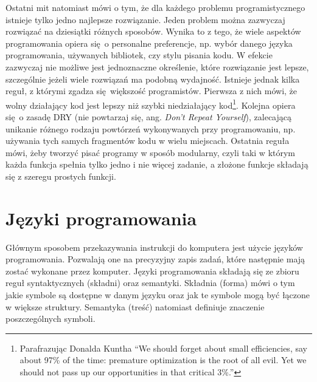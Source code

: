 \documentclass[paper=6in:9in,pagesize=pdftex,headinclude=on,footinclude=on,10pt]{scrbook}
\begin{document}
Ostatni mit natomiast mówi o tym, że dla każdego problemu programistycznego istnieje tylko jedno najlepsze rozwiązanie.
Jeden problem można zazwyczaj rozwiązać na dziesiątki różnych sposobów.
Wynika to z tego, że wiele aspektów programowania opiera się~o personalne preferencje, np. wybór danego języka programowania, używanych bibliotek, czy stylu pisania kodu.
W efekcie zazwyczaj nie możliwe jest jednoznaczne określenie, które rozwiązanie jest lepsze, szczególnie jeżeli wiele rozwiązań ma podobną wydajność.
Istnieje jednak kilka reguł, z którymi zgadza się~większość programistów.
Pierwsza z nich mówi, że wolny działający kod jest lepszy niż szybki niedziałający kod\footnote{Parafrazując Donalda Kuntha ``We should forget about small efficiencies, say about 97\% of the time: premature optimization is the root of all evil. Yet we should not pass up our opportunities in that critical 3\%.''}.
Kolejna opiera się~o zasadę DRY (nie powtarzaj się, ang. \emph{Don't Repeat Yourself}), zalecającą unikanie różnego rodzaju powtórzeń wykonywanych przy programowaniu, np. używania tych samych fragmentów kodu w wielu miejscach.
Ostatnia reguła mówi, żeby tworzyć pisać programy w sposób modularny, czyli taki w którym każda funkcja spełnia tylko jedno i nie więcej zadanie, a złożone funkcje składają się z szeregu prostych funkcji.

\hypertarget{jezyki-programowania}{%
\section{Języki programowania}\label{jezyki-programowania}}

Głównym sposobem przekazywania instrukcji do komputera jest użycie języków programowania.
Pozwalają one na precyzyjny zapis zadań, które następnie mają zostać wykonane przez komputer.
Języki programowania składają się ze zbioru reguł syntaktycznych (składni) oraz semantyki.
Składnia (forma) mówi o tym jakie symbole są dostępne w danym języku oraz jak te symbole mogą być łączone w większe struktury.
Semantyka (treść) natomiast definiuje znaczenie poszczególnych symboli.
\end{document}
